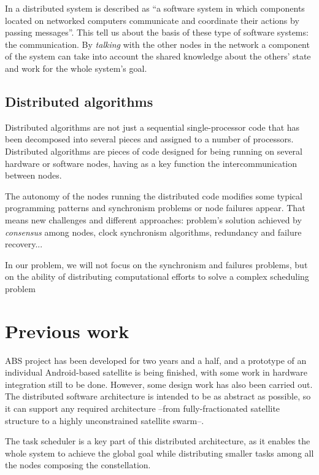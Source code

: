 In \cite{CitaColouris} a distributed system is described as ``a software system in which components located on networked computers communicate and coordinate their actions by passing messages''. This tell us about the basis of these type of software systems: the communication. By \emph{talking} with the other nodes in the network a component of the system can take into account the shared knowledge about the others' state and work for the whole system's goal.

\subsection{Distributed algorithms}
 
Distributed algorithms are not just a sequential single-processor code that has been decomposed into several pieces and assigned to a number of processors. Distributed algorithms are pieces of code designed for being running on several hardware or software nodes, having as a key function the intercommunication between nodes.

The autonomy of the nodes running the distributed code modifies some typical programming patterns and synchronism problems or node failures appear. That means new challenges and different approaches: problem's solution achieved by \emph{consensus} among nodes, clock synchronism algorithms, redundancy and failure recovery...

In our problem, we will not focus on the synchronism and failures problems, but on the ability of distributing computational efforts to solve a complex scheduling problem

\section{Previous work}

ABS project has been developed for two years and a half, and a prototype of an individual Android-based satellite is being finished, with some work in hardware integration still to be done. However, some design work has also been carried out. The distributed software architecture is intended to be as abstract as possible, so it can support any required architecture --from fully-fractionated satellite structure to a highly unconstrained satellite swarm--.

The task scheduler is a key part of this distributed architecture, as it enables the whole system to achieve the global goal while distributing smaller tasks among all the nodes composing the constellation.

